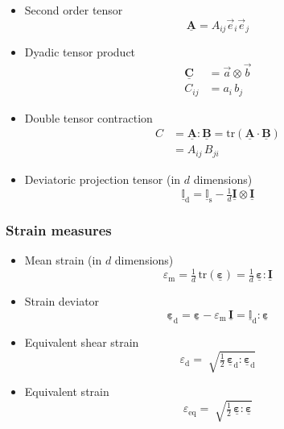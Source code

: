 \documentclass[times,namecite]{goose-article}
\newcommand\T[1]{\underline{\bm{{#1}}}}
\newcommand\TT[1]{\underline{\mathbb{{#1}}}}
\begin{document}
\begin{itemize}
%
\item Second order tensor
\begin{equation}
  \T{A} = A_{ij} \vec{e}_i \vec{e}_j
\end{equation}
%
\item Dyadic tensor product
\begin{align}
  \T{C} &= \vec{a} \otimes \vec{b} \\
  C_{ij} &= a_{i} \, b_{j}
\end{align}
%
\item Double tensor contraction
\begin{align}
  C &= \T{A} : \T{B} = \text{tr} \left( \T{A} \cdot \T{B} \right) \\
    &= A_{ij} \, B_{ji}
\end{align}
%
\item Deviatoric projection tensor (in $d$ dimensions)
\begin{equation}
  \TT{I}_\mathrm{d}
  = \TT{I}_\mathrm{s} - \tfrac{1}{d} \T{I} \otimes \T{I}
\end{equation}
%
\end{itemize}

\subsubsection{Strain measures}
\label{sec:nomenclature::strain}

\begin{itemize}
%
\item Mean strain (in $d$ dimensions)
\begin{equation}
  \varepsilon_\mathrm{m}
  = \tfrac{1}{d} \, \mathrm{tr} ( \T{\varepsilon} )
  = \tfrac{1}{d} \, \T{\varepsilon} : \T{I}
\end{equation}
%
\item Strain deviator
\begin{equation}
  \T{\varepsilon}_\mathrm{d}
  = \T{\varepsilon} - \varepsilon_\mathrm{m} \, \T{I}
  = \TT{I}_\mathrm{d} : \T{\varepsilon}
\end{equation}
%
\item Equivalent shear strain
\begin{equation}
  \varepsilon_\mathrm{d}
  = \; \sqrt{
    \tfrac{1}{2} \, \T{\varepsilon}_\mathrm{d} : \T{\varepsilon}_\mathrm{d}
  }
\end{equation}
%
\item Equivalent strain
\begin{equation}
  \varepsilon_\mathrm{eq}
  = \; \sqrt{
    \tfrac{1}{2} \, \T{\varepsilon} : \T{\varepsilon}
  }
\end{equation}
%
\end{itemize}
\end{document}
